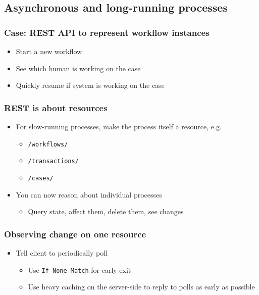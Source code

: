 \documentclass[8pt]{article}
\begin{document}
\subsection{Asynchronous and long-running processes}
\label{sec:org3217e44}
\subsubsection{Case: REST API to represent workflow instances}
\label{sec:orgf2ebaec}
\begin{itemize}
\item Start a new workflow
\item See which human is working on the case
\item Quickly resume if system is working on the case
\end{itemize}
\subsubsection{REST is about resources}
\label{sec:orgd3fd6e9}
\begin{itemize}
\item For slow-running processes, make the process itself a resource, e.g.
\begin{itemize}
\item \texttt{/workflows/}
\item \texttt{/transactions/}
\item \texttt{/cases/}
\end{itemize}
\item You can now reason about individual processes
\begin{itemize}
\item Query state, affect them, delete them, see changes
\end{itemize}
\end{itemize}
\subsubsection{Observing change on one resource}
\label{sec:org5d1272e}
\begin{itemize}
\item Tell client to periodically poll
\begin{itemize}
\item Use \texttt{If-None-Match} for early exit
\item Use heavy caching on the server-side to reply to polls as early as possible
\end{itemize}
\end{itemize}
\end{document}
